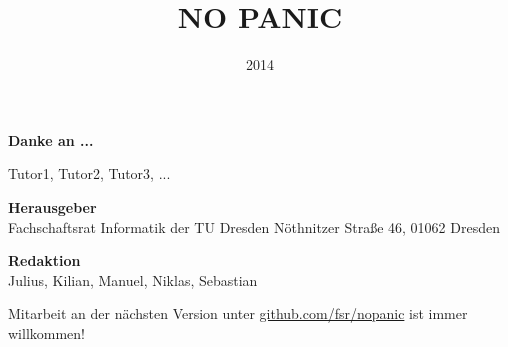 \documentclass[a5paper,12pt,oneside]{scrbook} %
\title{NO PANIC}
\date{2014}
\begin{document}
\pagecolor{black}
\color{white}
\maketitle
\color{black}
\pagecolor{white}
\tableofcontents

\vspace{1cm} %
\textbf{Danke an ...}

Tutor1, Tutor2, Tutor3, ...





















\newpage
\pagecolor{black}
\color{white}
\textbf{Herausgeber} \\
Fachschaftsrat Informatik der TU Dresden
Nöthnitzer Straße 46, 01062 Dresden

\textbf{Redaktion} \\
Julius,
Kilian,
Manuel,
Niklas,
Sebastian

Mitarbeit an der nächsten Version unter \url{github.com/fsr/nopanic} ist immer willkommen!
\end{document}
